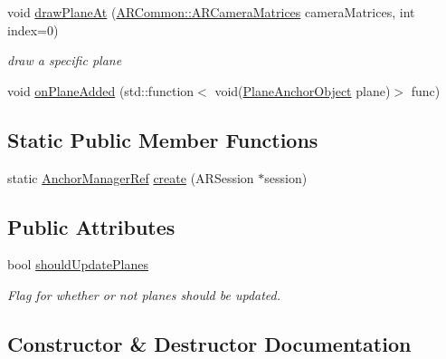 \begin{DoxyCompactItemize}
void \hyperlink{class_a_r_core_1_1_a_r_anchor_manager_a68742132d494088fcf6be20c776ca0c6}{draw\+Plane\+At} (\hyperlink{struct_a_r_common_1_1_a_r_camera_matrices}{A\+R\+Common\+::\+A\+R\+Camera\+Matrices} camera\+Matrices, int index=0)
\begin{DoxyCompactList}\small\item\em draw a specific plane \end{DoxyCompactList}\item 
void \hyperlink{class_a_r_core_1_1_a_r_anchor_manager_a1823c29c5b2d0d407e66b98378bf8c5f}{on\+Plane\+Added} (std\+::function$<$ void(\hyperlink{struct_a_r_objects_1_1_plane_anchor_object}{Plane\+Anchor\+Object} plane)$>$ func)
\end{DoxyCompactItemize}
\subsection*{Static Public Member Functions}
\begin{DoxyCompactItemize}
\item 
static \hyperlink{namespace_a_r_core_a3f2b9ba00b51ce19c1010f554a66a512}{Anchor\+Manager\+Ref} \hyperlink{class_a_r_core_1_1_a_r_anchor_manager_ab1293c2f5911e273573b1df3643fd086}{create} (A\+R\+Session $\ast$session)
\end{DoxyCompactItemize}
\subsection*{Public Attributes}
\begin{DoxyCompactItemize}
\item 
bool \hyperlink{class_a_r_core_1_1_a_r_anchor_manager_af67de0a611ff8a2786891eabb0ca571f}{should\+Update\+Planes}
\begin{DoxyCompactList}\small\item\em Flag for whether or not planes should be updated. \end{DoxyCompactList}\end{DoxyCompactItemize}


\subsection{Constructor \& Destructor Documentation}
\mbox{\label{class_a_r_core_1_1_a_r_anchor_manager_ad4f5727e58d9b4c6f582c50ba5ac0f49}} 
